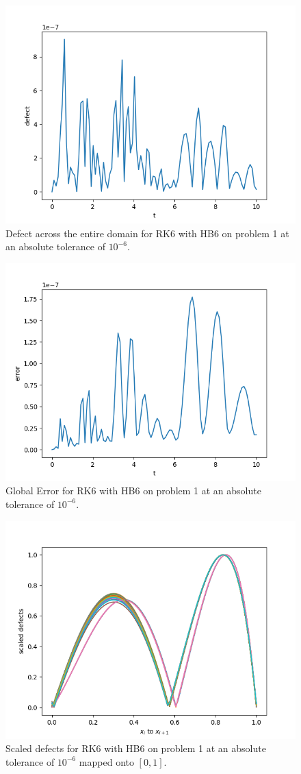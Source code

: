 \begin{figure}[H]
\centering
\includegraphics[width=0.7\linewidth]{./figures/rk6_with_hb6_p1_global_defect}
\caption{Defect across the entire domain for RK6 with HB6 on problem 1 at an absolute tolerance of $10^{-6}$.}
\label{fig:rk6_with_hb6_p1_global_defect}
\end{figure}

\begin{figure}[H]
\centering
\includegraphics[width=0.7\linewidth]{./figures/rk6_with_hb6_p1_global_error}
\caption{Global Error for RK6 with HB6 on problem 1 at an absolute tolerance of $10^{-6}$.}
\label{fig:rk6_with_hb6_p1_global_error}
\end{figure}

\begin{figure}[H]
\centering
\includegraphics[width=0.7\linewidth]{./figures/rk6_with_hb6_p1_scaled_defects}
\caption{Scaled defects for RK6 with HB6 on problem 1 at an absolute tolerance of $10^{-6}$ mapped onto $[0, 1]$.}
\label{fig:rk6_with_hb6_p1_scaled_defects}
\end{figure}

